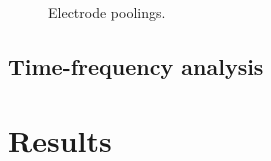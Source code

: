 \documentclass[../dwyatte_dissertation.tex]{subfiles}
\begin{document}
\begin{figure}[h]
\begin{tabular}{ll}
\end{tabular}
\caption{Electrode poolings.}{}
\label{fig:channels}
\end{figure}

\subsection{Time-frequency analysis}

\section{Results}



\end{document}
